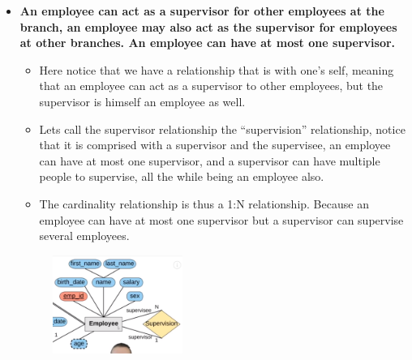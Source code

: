 \begin{itemize}
    \item \textbf{An employee can act as a supervisor for other employees at the branch, an employee may also act as the supervisor for employees at other branches. An employee can have at most one supervisor.}
        \begin{itemize}
            \item Here notice that we have a relationship that is with one's self, meaning that an employee can act as a supervisor to other employees, but the supervisor is himself an employee as well.
            \item Lets call the supervisor relationship the ``supervision'' relationship, notice that it is comprised with a supervisor and the supervisee, an employee can have at most one supervisor, and a supervisor can have multiple people to supervise, all the while being an employee also.
            \item The cardinality relationship is thus a 1:N relationship. Because an employee can have at most one supervisor but a supervisor can supervise several employees.
        \end{itemize}
        \begin{figure}[H]
            \centering
            \includegraphics[width=0.4\textwidth]{./Figs/2020-12-24-00-32-14.png}
        \end{figure}
    

\end{itemize}
